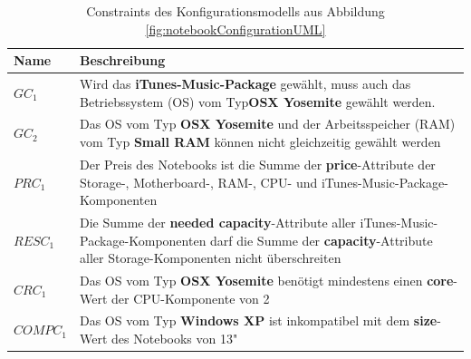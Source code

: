 \documentclass[12pt,a4paper,bibliography=totocnumbered,listof=totoc]{scrartcl}
\begin{document}
\begin{table}[]
\centering
\caption{Constraints des Konfigurationsmodells aus Abbildung \ref{fig:notebookConfigurationUML}}
\label{tab:notebookConfigurationConstraints}
\begin{tabularx}{\textwidth}{|l|X|}
\hline
{\bf Name} & {\bf Beschreibung}\\
\hline
$GC_1$ & Wird das \textbf{iTunes-Music-Package} gewählt, muss auch das Betriebssystem (OS) vom Typ\textbf{OSX Yosemite} gewählt werden. \\
\hline
$GC_2$ & Das OS vom Typ \textbf{OSX Yosemite} und der Arbeitsspeicher (RAM) vom Typ \textbf{Small RAM} können nicht gleichzeitig gewählt werden\\
\hline
$PRC_1$ & Der Preis des Notebooks ist die Summe der \textbf{price}-Attribute der Storage-, Motherboard-, RAM-, CPU- und iTunes-Music-Package-Komponenten\\
\hline
$RESC_1$ & Die Summe der \textbf{needed capacity}-Attribute aller iTunes-Music-Package-Komponenten darf die Summe der \textbf{capacity}-Attribute aller Storage-Komponenten nicht überschreiten\\
\hline
$CRC_1$ & Das OS vom Typ \textbf{OSX Yosemite} benötigt mindestens einen \textbf{core}-Wert der CPU-Komponente von 2\\
\hline
$COMPC_1$ & Das OS vom Typ \textbf{Windows XP} ist inkompatibel mit dem \textbf{size}-Wert des Notebooks von 13"\\
\hline
\end{tabularx}
\end{table}
\end{document}
